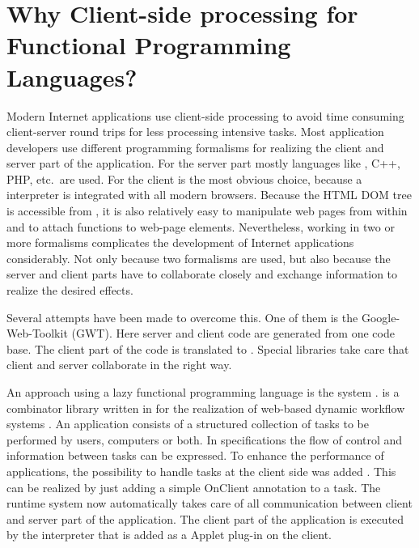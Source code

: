 \section{Why Client-side processing for Functional Programming Languages?} \label{sapljs:sec:motivation}
Modern Internet applications use client-side processing to avoid time consuming client-server round trips 
for less processing intensive tasks.
Most application developers use different programming formalisms for realizing the client and server part of the application.
For the server part mostly languages like \Java, \textsf{C++}, \textsf{PHP}, etc.\ are used.
For the client \JS is the most obvious choice, because a \JS interpreter is integrated with all modern browsers.
Because the \textsf{HTML} \textsf{DOM} tree is accessible from \JS, it is also relatively easy to manipulate web pages from within \JS and to attach \JS functions to web-page elements.
Nevertheless, working in two or more formalisms complicates the development of Internet applications considerably. 
Not only because two formalisms are used, but also because the server and client parts have to collaborate closely
and exchange information to realize the desired effects.

Several attempts have been made to overcome this. One of them is the Google-Web-Toolkit (\textsf{GWT}). 
Here server and client code are generated from one \Java code base. 
The client part of the code is translated to \JS.
Special libraries take care that client and server collaborate in the right way.

An  approach using a lazy functional programming language is the \iTask system \cite{ITASK}. 
\iTask is a combinator library written in  \Clean 
for the realization of web-based dynamic workflow systems \cite{LDTA2010}. 
An \iTask application consists of a structured collection of tasks to be performed by users, 
computers or both.
In \iTask specifications the flow of control and information between tasks can be expressed. 
To enhance the performance of \iTask applications, 
the possibility to handle tasks at the client side was added \cite{ITASK_AJAX}. 
This can be realized by just adding a simple \textsf{OnClient} annotation to a task. 
The \iTask runtime system now automatically takes care of all communication between 
client and server part of the application. The client part of the application is executed
by the \Sapl interpreter that is added as a \Java Applet plug-in on the client.


